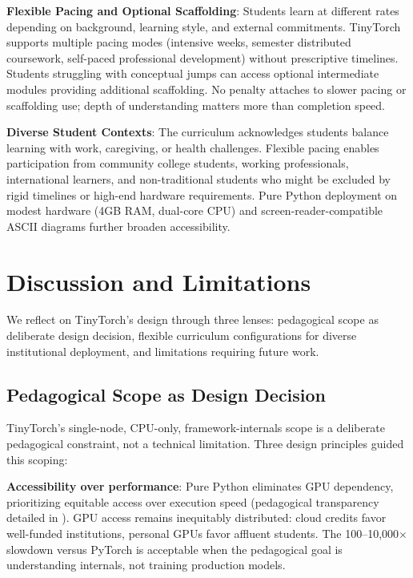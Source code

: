 \documentclass[10pt,twocolumn]{article}
\begin{document}
\textbf{Flexible Pacing and Optional Scaffolding}: Students learn at different rates depending on background, learning style, and external commitments. TinyTorch supports multiple pacing modes (intensive weeks, semester distributed coursework, self-paced professional development) without prescriptive timelines. Students struggling with conceptual jumps can access optional intermediate modules providing additional scaffolding. No penalty attaches to slower pacing or scaffolding use; depth of understanding matters more than completion speed.

\textbf{Diverse Student Contexts}: The curriculum acknowledges students balance learning with work, caregiving, or health challenges. Flexible pacing enables participation from community college students, working professionals, international learners, and non-traditional students who might be excluded by rigid timelines or high-end hardware requirements. Pure Python deployment on modest hardware (4GB RAM, dual-core CPU) and screen-reader-compatible ASCII diagrams further broaden accessibility.

\section{Discussion and Limitations}
\label{sec:discussion}

We reflect on TinyTorch's design through three lenses: pedagogical scope as deliberate design decision, flexible curriculum configurations for diverse institutional deployment, and limitations requiring future work.

\subsection{Pedagogical Scope as Design Decision}
\label{subsec:scope}

TinyTorch's single-node, CPU-only, framework-internals scope is a deliberate pedagogical constraint, not a technical limitation. Three design principles guided this scoping:

\textbf{Accessibility over performance}: Pure Python eliminates GPU dependency, prioritizing equitable access over execution speed (pedagogical transparency detailed in ). GPU access remains inequitably distributed: cloud credits favor well-funded institutions, personal GPUs favor affluent students. The 100--10,000$\times$ slowdown versus PyTorch is acceptable when the pedagogical goal is understanding internals, not training production models.
\end{document}
